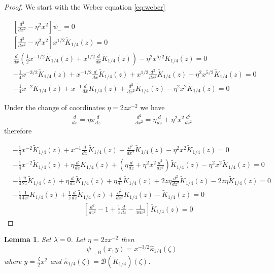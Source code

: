 \documentclass{article}
\theoremstyle{definition}
\theoremstyle{plain}
\newtheorem{lemma}{Lemma}
\begin{document}
\begin{proof}
We start with the Weber equation \eqref{eq:weber}

\begin{align*}
&\left[\frac{d^2}{dx^2}-\eta^2x^2\right]\psi_-=0\\
&\left[\frac{d^2}{dx^2}-\eta^2x^2\right]x^{1/2}\tilde{K}_{1/4}(z)=0\\
&\frac{d}{dx}\left(\frac{1}{2}x^{-1/2}\tilde{K}_{1/4}(z)+x^{1/2}\frac{d}{dx}\tilde{K}_{1/4}(z)\right)-\eta^2x^{5/2}\tilde{K}_{1/4}(z)=0\\
&-\frac{1}{4}x^{-3/2}\tilde{K}_{1/4}(z)+x^{-1/2}\frac{d}{dx}\tilde{K}_{1/4}(z)+x^{1/2}\frac{d^2}{dx^2}\tilde{K}_{1/4}(z)-\eta^2x^{5/2}\tilde{K}_{1/4}(z)=0\\
&-\frac{1}{4}x^{-2}\tilde{K}_{1/4}(z)+x^{-1}\frac{d}{dx}\tilde{K}_{1/4}(z)+\frac{d^2}{dx^2}\tilde{K}_{1/4}(z)-\eta^2x^{2}\tilde{K}_{1/4}(z)=0
\end{align*}

Under the change of coordinates $\eta=2zx^{-2}$ we have
\begin{align*}
\frac{d}{dx}=\eta x\frac{d}{dz} & \qquad \qquad \frac{d^2}{dx^2}=\eta\frac{d}{dz}+\eta^2 x^2\frac{d^2}{dz^2}
\end{align*}
therefore

\begin{align*}
&-\frac{1}{4}x^{-2}\tilde{K}_{1/4}(z)+x^{-1}\frac{d}{dx}\tilde{K}_{1/4}(z)+\frac{d^2}{dx^2}\tilde{K}_{1/4}(z)-\eta^2x^{2}\tilde{K}_{1/4}(z)=0\\
&-\frac{1}{4}x^{-2}\tilde{K}_{1/4}(z)+\eta\frac{d}{dz}K_{1/4}(z)+\left(\eta\frac{d}{dz}+\eta^2 x^2\frac{d^2}{dz^2}\right)\tilde{K}_{1/4}(z)-\eta^2x^{2}\tilde{K}_{1/4}(z)=0\\
&-\frac{1}{4}\frac{\eta}{2z}\tilde{K}_{1/4}(z)+\eta\frac{d}{dz}\tilde{K}_{1/4}(z)+\eta\frac{d}{dz}\tilde{K}_{1/4}(z)+2z\eta \frac{d^2}{dz^2}\tilde{K}_{1/4}(z)-2z\eta \tilde{K}_{1/4}(z)=0\\
&-\frac{1}{4}\frac{1}{4z^2}K_{1/4}(z)+\frac{1}{z}\frac{d}{dz}\tilde{K}_{1/4}(z)+ \frac{d^2}{dz^2}K_{1/4}(z)- \tilde{K}_{1/4}(z)=0\\
&\qquad\qquad\qquad\qquad\qquad \left[\frac{d^2}{dz^2}-1+\frac{1}{z}\frac{d}{dz}-\frac{1}{16 z^2}\right]\tilde{K}_{1/4}(z)=0
\end{align*}


\end{proof}



\begin{lemma}
Set $\lambda=0$. Let $\eta=2zx^{-2}$ then \[\psi_{-,B}(x,y)=x^{-3/2}\hat{\kappa}_{1/4}(\zeta)\] where $y=\frac{\zeta}{2}x^2$ and $\hat{\kappa}_{1/4}(\zeta)=\mathcal{B}(\tilde{K}_{1/4})(\zeta)$. 
\end{lemma}
\end{document}

